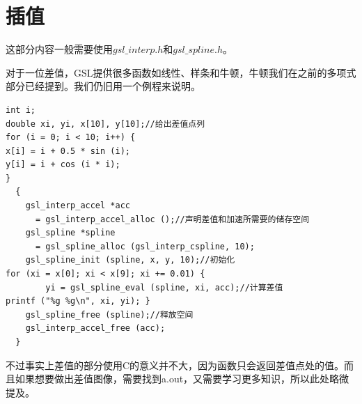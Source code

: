 \documentclass[a4paper,11pt,onecolumn,twoside]{article}
\begin{document}
\section{插值}
这部分内容一般需要使用$gsl\_interp.h$和$gsl\_spline.h$。\par
对于一位差值，GSL提供很多函数如线性、样条和牛顿，牛顿我们在之前的多项式部分已经提到。我们仍旧用一个例程来说明。
\begin{lstlisting}
int i;
double xi, yi, x[10], y[10];//给出差值点列
for (i = 0; i < 10; i++) {
x[i] = i + 0.5 * sin (i);
y[i] = i + cos (i * i);
}
  {
    gsl_interp_accel *acc
      = gsl_interp_accel_alloc ();//声明差值和加速所需要的储存空间
    gsl_spline *spline
      = gsl_spline_alloc (gsl_interp_cspline, 10);
    gsl_spline_init (spline, x, y, 10);//初始化
for (xi = x[0]; xi < x[9]; xi += 0.01) {
        yi = gsl_spline_eval (spline, xi, acc);//计算差值
printf ("%g %g\n", xi, yi); }
    gsl_spline_free (spline);//释放空间
    gsl_interp_accel_free (acc);
  }
\end{lstlisting}
不过事实上差值的部分使用C的意义并不大，因为函数只会返回差值点处的值。而且如果想要做出差值图像，需要找到a.out，又需要学习更多知识，所以此处略微提及。
\end{document}
